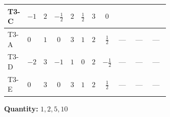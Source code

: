 \documentclass[8pt]{article}
\begin{document}
\begin{landscape}
\begin{longtable}{@{}llcccccc >{\raggedright\arraybackslash}p{0.21\linewidth} >{\raggedright\arraybackslash}p{0.21\linewidth} >{\raggedright\arraybackslash}p{0.21\linewidth}@{}}
T3-C & $-1$ & $2$ & $-\frac{1}{2}$ & $2$ & $\frac{1}{2}$ & $3$ & $0$ & \scriptsize\adjustbox{max width=\linewidth}{$\begin{gathered} - \frac{i lambda12Inv2 \overline{y_{1}} \overline{y_{2}}}{6 MF}\end{gathered}$} & \scriptsize\adjustbox{max width=\linewidth}{$\begin{gathered} - \frac{\sqrt{3} i g_{2}^{2} \overline{y_{1}} \overline{y_{2}}}{8 MF}\end{gathered}$} & \scriptsize\adjustbox{max width=\linewidth}{$\begin{gathered} \frac{\sqrt{3} i ye \overline{y_{1}} \overline{y_{2}} \overline{ye}}{24 MF}\end{gathered}$} \\
\midrule
T3-A & $0$ & $1$ & $0$ & $3$ & $1$ & $2$ & $\frac{1}{2}$ & --- & --- & --- \\
\midrule
T3-D & $-2$ & $3$ & $-1$ & $1$ & $0$ & $2$ & $-\frac{1}{2}$ & --- & --- & --- \\
\midrule
T3-E & $0$ & $3$ & $0$ & $3$ & $1$ & $2$ & $\frac{1}{2}$ & --- & --- & --- \\
\midrule
\bottomrule
\end{longtable}
\clearpage
\noindent\textbf{Quantity: }$\mathrm{1,2,5,10}$\par\smallskip

\end{landscape}
\end{document}
